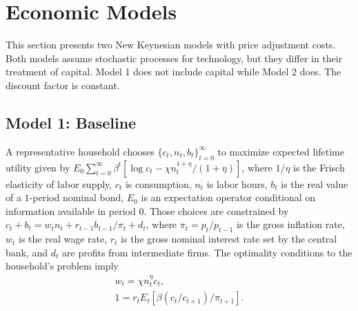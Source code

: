 \documentclass[12pt,final]{article}
\begin{document}
\section{Economic Models} \label{sec:models}

This section presents two New Keynesian models with \citet{Rotemberg1982} price adjustment costs. Both models assume stochastic processes for technology, but they differ in their treatment of capital. Model 1 does not include capital while Model 2 does. The discount factor is constant.

\subsection{Model 1: Baseline}\label{sec:model1}

A representative household chooses $\{c_t,n_t,b_t\}_{t=0}^\infty$ to maximize expected lifetime utility given by $E_0\sum_{t=0}^\infty\beta^{t}[\log c_t-\chi n_t^{1+\eta}/(1+\eta)]$, where $1/\eta$ is the Frisch elasticity of labor supply, $c_t$ is consumption, $n_t$ is labor hours, $b_t$ is the real value of a $1$-period nominal bond, $E_0$ is an expectation operator conditional on information available in period $0$. Those choices are constrained by $c_t+b_t=w_tn_t+r_{t-1}b_{t-1}/\pi_t+d_t$, where $\pi_t=p_t/p_{t-1}$ is the gross inflation rate, $w_t$ is the real wage rate, $r_t$ is the gross nominal interest rate set by the central bank, and $d_t$ are profits from intermediate firms. The optimality conditions to the household's problem imply
\begin{gather}
  w_t=\chi n_t^\eta c_t,  \label{FOC labor} \\
  1= r_tE_t[\beta (c_t/c_{t+1})/\pi_{t+1}]. \label{bond euler1}
\end{gather}
\end{document}
